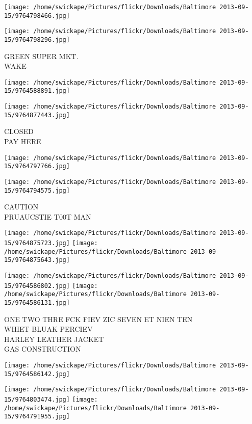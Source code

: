 \documentclass[10pt,letterpaper]{article}
\begin{document}
\texttt{[image: /home/swickape/Pictures/flickr/Downloads/Baltimore 2013-09-15/9764798466.jpg]}

\vspace{0.25in}
\texttt{[image: /home/swickape/Pictures/flickr/Downloads/Baltimore 2013-09-15/9764798296.jpg]}

GREEN SUPER MKT.\\
WAKE
\pagebreak

\texttt{[image: /home/swickape/Pictures/flickr/Downloads/Baltimore 2013-09-15/9764588891.jpg]}

\vspace{0.25in}
\texttt{[image: /home/swickape/Pictures/flickr/Downloads/Baltimore 2013-09-15/9764877443.jpg]}

CLOSED\\
PAY HERE
\pagebreak

\texttt{[image: /home/swickape/Pictures/flickr/Downloads/Baltimore 2013-09-15/9764797766.jpg]}

\vspace{0.25in}
\texttt{[image: /home/swickape/Pictures/flickr/Downloads/Baltimore 2013-09-15/9764794575.jpg]}

CAUTION\\
PRUAUCSTIE T00T MAN
\pagebreak

\texttt{[image: /home/swickape/Pictures/flickr/Downloads/Baltimore 2013-09-15/9764875723.jpg]}
\texttt{[image: /home/swickape/Pictures/flickr/Downloads/Baltimore 2013-09-15/9764875643.jpg]}

\texttt{[image: /home/swickape/Pictures/flickr/Downloads/Baltimore 2013-09-15/9764586802.jpg]}
\texttt{[image: /home/swickape/Pictures/flickr/Downloads/Baltimore 2013-09-15/9764586131.jpg]}

ONE TWO THRE FCK FIEV ZIC SEVEN ET NIEN TEN\\
WHIET BLUAK PERCIEV\\
HARLEY LEATHER JACKET\\
GAS CONSTRUCTION
\pagebreak

\texttt{[image: /home/swickape/Pictures/flickr/Downloads/Baltimore 2013-09-15/9764586142.jpg]}

\vspace{0.25in}
\texttt{[image: /home/swickape/Pictures/flickr/Downloads/Baltimore 2013-09-15/9764803474.jpg]}
\texttt{[image: /home/swickape/Pictures/flickr/Downloads/Baltimore 2013-09-15/9764791955.jpg]}
\end{document}

